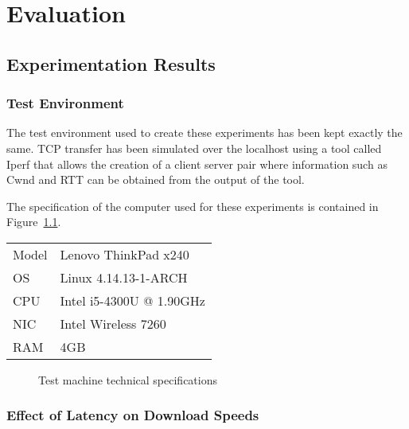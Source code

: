 \chapter{Evaluation}


\section{Experimentation Results}
\subsection{Test Environment}
The test environment used to create these experiments has been kept exactly the same. TCP transfer has been simulated over the localhost using a tool called Iperf \citep{gates2003iperf} that allows the creation of a client server pair where information such as Cwnd and RTT can be obtained from the output of the tool.

The specification of the computer used for these experiments is contained in Figure~\ref{ref:testmachine}.

\begin{center}
\begin{tabular}{| l | l |}
	\hline
	Model	& Lenovo ThinkPad x240			\\
	OS 		& Linux 4.14.13-1-ARCH			\\
	CPU 	& Intel i5-4300U @ 1.90GHz		\\
	NIC		& Intel Wireless 7260			\\
	RAM		& 4GB							\\
	\hline
\end{tabular}
\begin{figure}[h]
	\caption{Test machine technical specifications}
	\label{ref:testmachine}
\end{figure}
\end{center}

\subsection{Effect of Latency on Download Speeds}


